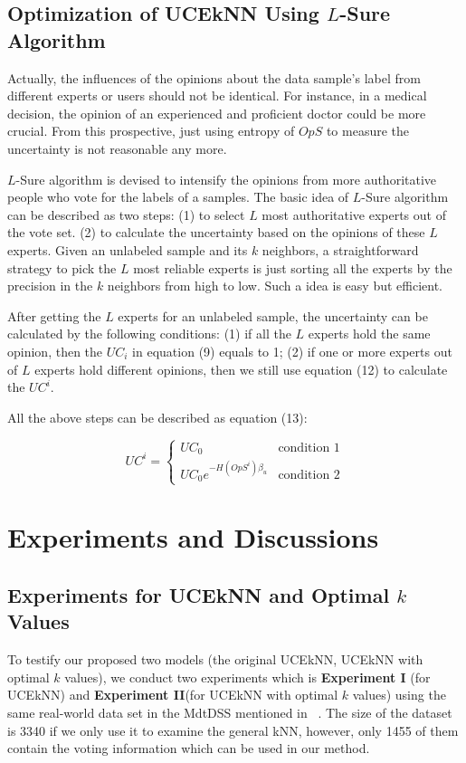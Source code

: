 \documentclass[runningheads]{llncs}
\begin{document}
\subsection{Optimization of UCEkNN Using $L$-Sure Algorithm}
Actually, the influences of the opinions about the data sample's label from different  experts or users should not be identical. For instance, in a medical decision, the opinion of an experienced and proficient doctor could be more crucial. From this prospective, just using entropy of $OpS$ to measure the uncertainty is not reasonable any more.

$L$-Sure algorithm is devised to intensify the opinions from more authoritative people who vote for the labels of a samples. The basic idea of $L$-Sure algorithm can be described as two steps: (1) to select $L$ most authoritative experts out of the vote set. (2) to calculate the uncertainty based on the opinions of these $L$ experts.
Given an unlabeled sample and its $k$ neighbors, a straightforward strategy to pick the $L$ most reliable experts is just sorting all the experts by the precision in the $k$ neighbors from high to low. Such a idea is easy but efficient.

After getting the $L$ experts for an unlabeled sample, the uncertainty can be calculated by the following conditions: (1) if all the $L$ experts hold the same opinion, then the $UC_i$ in equation (9) equals to 1; (2) if one or more experts out of $L$ experts hold different opinions, then we still use equation (12) to calculate the $UC^i$.

All the above steps can be described as equation (13):

\begin{equation}
UC^i=
\begin{cases}
UC_0& \text{condition 1}\\
UC_0e^{-H(OpS^i)\beta_u}& \text{condition 2}
\end{cases}
\end{equation}

\section{Experiments and Discussions}
\subsection{Experiments for UCEkNN and Optimal $k$ Values}
To testify our proposed two models (the original UCEkNN, UCEkNN with optimal $k$ values), we conduct two experiments which is \textbf{Experiment I} (for UCEkNN) and \textbf{Experiment II}(for UCEkNN with optimal $k$ values) using the same real-world data set in the MdtDSS mentioned in ~\cite{ref_article9}. The size of the dataset is 3340 if we only use it to examine the general kNN, however, only 1455 of them contain the voting information which can be used in our method. 
\end{document}
